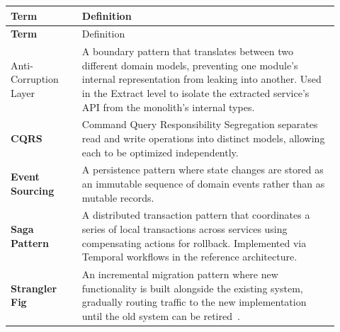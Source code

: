 \begin{longtable}{>{\bfseries}p{0.20\linewidth} p{0.72\linewidth}}
\toprule
Term & Definition \\
\midrule
\endfirsthead
\toprule
Term & Definition \\
\midrule
\endhead
\bottomrule
\endfoot

Anti-Corruption Layer &
A boundary pattern that translates between two different domain models, preventing one module's internal representation from leaking into another. Used in the Extract level to isolate the extracted service's API from the monolith's internal types. \\

CQRS &
Command Query Responsibility Segregation separates read and write operations into distinct models, allowing each to be optimized independently. \\

Event Sourcing &
A persistence pattern where state changes are stored as an immutable sequence of domain events rather than as mutable records. \\

Saga Pattern &
A distributed transaction pattern that coordinates a series of local transactions across services using compensating actions for rollback. Implemented via Temporal workflows in the reference architecture. \\

Strangler Fig &
An incremental migration pattern where new functionality is built alongside the existing system, gradually routing traffic to the new implementation until the old system can be retired~\cite{fowler2014}. \\

\end{longtable}

